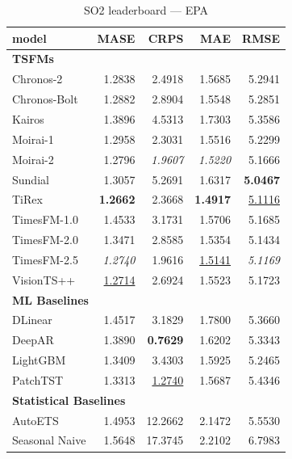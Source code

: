 \begin{table}[H]
\caption{SO2 leaderboard --- EPA}
\centering
\begin{small}
\begin{tabular}{lrrrr}
\toprule
model & MASE & CRPS & MAE & RMSE \\
\midrule
\multicolumn{5}{l}{\textbf{TSFMs}} \\
Chronos-2 & 1.2838 & 2.4918 & 1.5685 & 5.2941 \\
Chronos-Bolt & 1.2882 & 2.8904 & 1.5548 & 5.2851 \\
Kairos & 1.3896 & 4.5313 & 1.7303 & 5.3586 \\
Moirai-1 & 1.2958 & 2.3031 & 1.5516 & 5.2299 \\
Moirai-2 & 1.2796 & \textit{1.9607} & \textit{1.5220} & 5.1666 \\
Sundial & 1.3057 & 5.2691 & 1.6317 & \textbf{5.0467} \\
TiRex & \textbf{1.2662} & 2.3668 & \textbf{1.4917} & \underline{5.1116} \\
TimesFM-1.0 & 1.4533 & 3.1731 & 1.5706 & 5.1685 \\
TimesFM-2.0 & 1.3471 & 2.8585 & 1.5354 & 5.1434 \\
TimesFM-2.5 & \textit{1.2740} & 1.9616 & \underline{1.5141} & \textit{5.1169} \\
VisionTS++ & \underline{1.2714} & 2.6924 & 1.5523 & 5.1723 \\
\midrule
\multicolumn{5}{l}{\textbf{ML Baselines}} \\
DLinear & 1.4517 & 3.1829 & 1.7800 & 5.3660 \\
DeepAR & 1.3890 & \textbf{0.7629} & 1.6202 & 5.3343 \\
LightGBM & 1.3409 & 3.4303 & 1.5925 & 5.2465 \\
PatchTST & 1.3313 & \underline{1.2740} & 1.5687 & 5.4346 \\
\midrule
\multicolumn{5}{l}{\textbf{Statistical Baselines}} \\
AutoETS & 1.4953 & 12.2662 & 2.1472 & 5.5530 \\
Seasonal Naive & 1.5648 & 17.3745 & 2.2102 & 6.7983 \\
\bottomrule
\end{tabular}
\end{small}
\end{table}